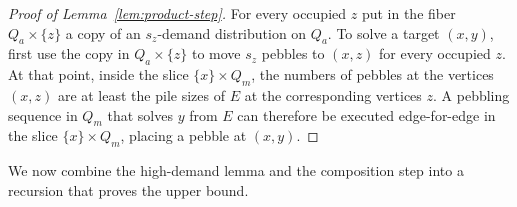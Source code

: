 \documentclass[11pt]{article}
\theoremstyle{plain}
\theoremstyle{definition}
\begin{document}
\begin{proof}[Proof of Lemma~\ref{lem:product-step}]
For every occupied $z$ put in the fiber $Q_a\times\{z\}$ a copy of an $s_z$-demand
distribution on $Q_a$.  To solve a target $(x,y)$, first use the copy in
$Q_a\times\{z\}$ to move $s_z$ pebbles to $(x,z)$ for every occupied $z$.  At that point,
inside the slice $\{x\}\times Q_m$, the numbers of pebbles at the vertices $(x,z)$ are
at least the pile sizes of $E$ at the corresponding vertices $z$. A pebbling sequence in
$Q_m$ that solves $y$ from $E$ can therefore be executed edge-for-edge in the slice
$\{x\}\times Q_m$, placing a pebble at $(x,y)$.
\end{proof}

We now combine the high-demand lemma and the composition step into a recursion that
proves the upper bound.
\end{document}
